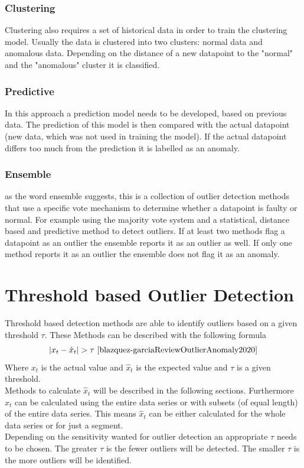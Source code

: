 \subsubsection{Clustering}
Clustering also requires a set of historical data in order to train the clustering model. Usually the data is clustered into two clusters: normal data and anomalous data. Depending on the distance of a new datapoint to the "normal" and the "anomalous" cluster it is classified.
\cite{cookAnomalyDetectionIoT2020, giannoniAnomalyDetectionModels2018, chandolaAnomalyDetectionSurvey2009}
\subsubsection{Predictive}
In this approach a prediction model needs to be developed, based on previous data. The prediction of this model is then compared with the actual datapoint (new data, which was not used in training the model). If the actual datapoint differs too much from the prediction it is labelled as an anomaly. \cite{cookAnomalyDetectionIoT2020, giannoniAnomalyDetectionModels2018}


\subsubsection{Ensemble}
as the word ensemble suggests, this is a collection of outlier detection methods that use a specific vote mechanism to determine whether a datapoint is faulty or normal. For example using the majority vote system and a statistical, distance based and predictive method to detect outliers. If at least two methods flag a datapoint as an outlier the ensemble reports it as an outlier as well. If only one method reports it as an outlier the ensemble does not flag it as an anomaly.
\cite{cookAnomalyDetectionIoT2020}

\section{Threshold based Outlier Detection}\label{section:threshold-based-outlier-detection}
Threshold based detection methods are able to identify outliers based on a given threshold $\tau$. These Methods can be described with the following formula
$$
  |x_t - \hat{x}_t | > \tau \text{ \cite{blazquez-garciaReviewOutlierAnomaly2020}}
$$
Where $x_t$ is the actual value and $\hat{x}_t$ is the expected value and $\tau$ is a given threshold.\\
Methods to calculate $\hat{x}_t$ will be described in the following sections. Furthermore $\hat{x}_t$ can be calculated using the entire data series or with subsets (of equal length) of the entire data series. This means $\hat{x}_t$ can be either calculated for the whole data series or for just a segment.\\
Depending on the sensitivity wanted for outlier detection an appropriate $\tau$ needs to be chosen. The greater $\tau$ is the fewer outliers will be detected. The smaller $\tau$ is the more outliers will be identified.  \cite{blazquez-garciaReviewOutlierAnomaly2020}

